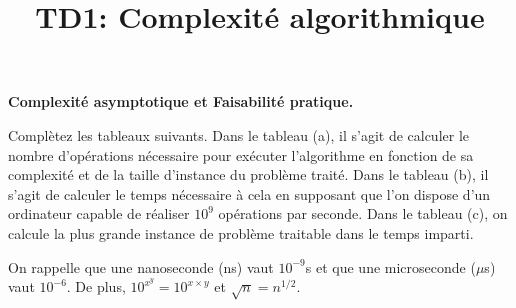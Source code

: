 \documentclass[10pt]{article}\usepackage[correction]{esial}
\begin{document}
\title{TD1: Complexité algorithmique}
\maketitle

\Exercice \textbf{Complexité asymptotique et Faisabilité pratique.}

\Question Complètez les tableaux suivants. Dans le tableau (a), il s'agit de
calculer le nombre d'opérations nécessaire pour exécuter l'algorithme en
fonction de sa complexité et de la taille d'instance du problème traité. Dans
le tableau (b), il s'agit de calculer le temps nécessaire à cela en supposant
que l'on dispose d'un ordinateur capable de réaliser $10^9$ opérations par
seconde. Dans le tableau (c), on calcule la plus grande instance de problème
traitable dans le temps imparti.

On rappelle que une nanoseconde (ns) vaut $10^{-9}$s et que une microseconde
($\mu$s) vaut $10^{-6}$. De plus, $10^{x^y}=10^{x\times y}$ et $\sqrt{n}=n^{1/2}$.
\end{document}
